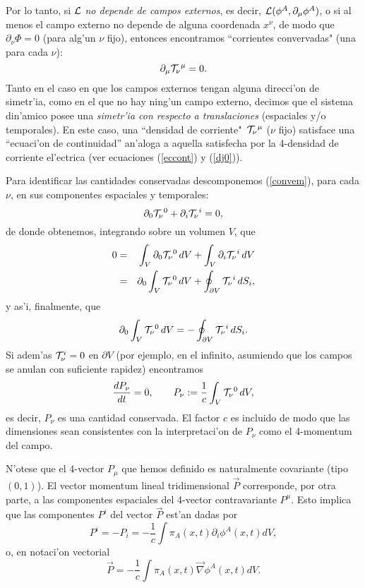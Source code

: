 Por lo tanto, si ${\cal L}$ {\em no depende de campos externos}, es decir,
${\cal L}(\phi ^{A},\partial_{\mu }\phi^{A})$, o si al menos el campo externo no
depende de alguna coordenada $x^\nu$, de modo que $\partial_\nu\Phi=0$ (para
alg'un $\nu$ fijo), entonces encontramos ``corrientes convervadas" (una para
cada $\nu$):
\begin{equation}
\partial _{\mu }{\cal T}_\nu{}^\mu =0 .\label{convem}
\end{equation}
Tanto en el caso en que los campos externos tengan alguna direcci'on de simetr'ia,
como en el que no hay ning'un campo externo, decimos que el sistema din'amico
posee una \textit{simetr'ia con respecto a translaciones} (espaciales y/o
temporales). En este caso, una ``densidad de corriente"\, ${\cal T}_\nu{}^\mu$ ($\nu$ fijo) satisface una ``ecuaci'on de continuidad'' an'aloga a aquella
satisfecha por la 4-densidad de corriente el'ectrica (ver ecuaciones
(\ref{eccont}) y (\ref{dj0})).

Para identificar las cantidades conservadas descomponemos (\ref{convem}), para
cada $\nu$, en sus componentes espaciales y temporales:
\begin{equation}
\partial_0{\cal T}_\nu{}^0+\partial_i{\cal T}_\nu{}^i=0, \label{dcompcons}
\end{equation}
de donde obtenemos, integrando sobre un volumen $V$, que
\begin{eqnarray}
0&=&\int_{V }\partial_0{\cal T}_\nu{}^0\,dV +\int_{V}\partial_i{\cal T}_\nu{}^i\,dV \\
&=&\partial_0\int_V {\cal T}_\nu{}^0\,dV +\oint_{\partial V}{\cal T}_\nu{}^i\,dS_i,
\end{eqnarray}
y as'i, finalmente, que
\begin{equation}
\partial_0\int_V {\cal T}_\nu{}^0\,dV =-\oint_{\partial V}{\cal T}_\nu{}^i\,dS_i  .
\end{equation}
Si adem'as ${\cal T}_\nu ^i=0$ en $\partial V$  (por ejemplo, en el infinito,
asumiendo que los campos se anulan con suficiente rapidez) encontramos
\begin{equation}
\frac{d P_\nu}{d t} =0,\qquad P_\nu :=\frac{1}{c} \int_V {\cal T}_\nu{}^0\,dV ,
\end{equation}
es decir, $P_\nu$ es una cantidad conservada. El factor $c$ es incluido de modo
que las dimensiones sean consistentes con la interpretaci'on de $P_\nu$ como el
4-momentum del campo.

N'otese que el 4-vector $P_\mu$ que hemos definido es naturalmente covariante
(tipo $(0,1)$). El vector momentum lineal tridimensional $\vec{P}$ corresponde,
por otra parte, a las componentes espaciales del 4-vector contravariante
$P^\mu$. Esto implica que las componentes $P^i$ del vector $\vec{P}$ est'an
dadas por
\begin{equation}
P^i = -P_i =-\frac{1}{c} \int \pi_A(x,t) \partial_i\phi^A(x,t) dV
,\label{MomentumLineal}
\end{equation}
o, en notaci'on vectorial
\begin{equation}
\vec{P}=-\frac{1}{c} \int \pi_A(x,t) \vec{\nabla}\phi^A(x,t) dV.
\end{equation}

